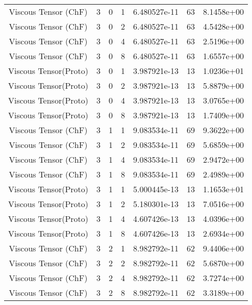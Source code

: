\documentclass{article}
\begin{document}
\begin{small} 
  \begin{table} 
    \begin{center}
      \begin{tabular}{|c|c|c|c|c|c||c|} \hline 
        \hline 
        Viscous Tensor  (ChF) & 3 & 0 & 1& 6.480527e-11 & 63 & 8.1458e+00\\
        Viscous Tensor  (ChF) & 3 & 0 & 2& 6.480527e-11 & 63 & 4.5428e+00\\
        Viscous Tensor  (ChF) & 3 & 0 & 4& 6.480527e-11 & 63 & 2.5196e+00\\
        Viscous Tensor  (ChF) & 3 & 0 & 8& 6.480527e-11 & 63 & 1.6557e+00\\
        Viscous Tensor(Proto) & 3 & 0 & 1& 3.987921e-13 & 13 & 1.0236e+01\\
        Viscous Tensor(Proto) & 3 & 0 & 2& 3.987921e-13 & 13 & 5.8879e+00\\
        Viscous Tensor(Proto) & 3 & 0 & 4& 3.987921e-13 & 13 & 3.0765e+00\\
        Viscous Tensor(Proto) & 3 & 0 & 8& 3.987921e-13 & 13 & 1.7409e+00\\
        \hline 
        Viscous Tensor  (ChF) & 3 & 1 & 1& 9.083534e-11 & 69 & 9.3622e+00\\
        Viscous Tensor  (ChF) & 3 & 1 & 2& 9.083534e-11 & 69 & 5.6859e+00\\
        Viscous Tensor  (ChF) & 3 & 1 & 4& 9.083534e-11 & 69 & 2.9472e+00\\
        Viscous Tensor  (ChF) & 3 & 1 & 8& 9.083534e-11 & 69 & 2.4989e+00\\
        Viscous Tensor(Proto) & 3 & 1 & 1& 5.000445e-13 & 13 & 1.1653e+01\\
        Viscous Tensor(Proto) & 3 & 1 & 2& 5.180301e-13 & 13 & 7.0516e+00\\
        Viscous Tensor(Proto) & 3 & 1 & 4& 4.607426e-13 & 13 & 4.0396e+00\\
        Viscous Tensor(Proto) & 3 & 1 & 8& 4.607426e-13 & 13 & 2.6934e+00\\
        \hline 
        Viscous Tensor  (ChF) & 3 & 2 & 1& 8.982792e-11 & 62 & 9.4406e+00\\
        Viscous Tensor  (ChF) & 3 & 2 & 2& 8.982792e-11 & 62 & 5.6870e+00\\
        Viscous Tensor  (ChF) & 3 & 2 & 4& 8.982792e-11 & 62 & 3.7274e+00\\
        Viscous Tensor  (ChF) & 3 & 2 & 8& 8.982792e-11 & 62 & 3.3189e+00\\

\end{tabular}
\end{center}
\end{table}
\end{small}
\end{document}
